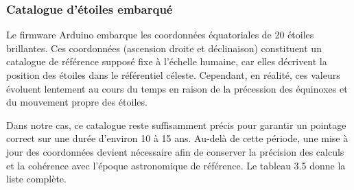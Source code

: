 \documentclass[12pt,a4paper]{report}
\begin{document}
\begin{enumerate}
\subsubsection{Catalogue d'étoiles embarqué}
Le firmware Arduino embarque les coordonnées équatoriales de 20 étoiles brillantes. Ces coordonnées (ascension droite et déclinaison) constituent un catalogue de référence supposé fixe à l’échelle humaine, car elles décrivent la position des étoiles dans le référentiel céleste. Cependant, en réalité, ces valeurs évoluent lentement au cours du temps en raison de la précession des équinoxes et du mouvement propre des étoiles.

Dans notre cas, ce catalogue reste suffisamment précis pour garantir un pointage correct sur une durée d’environ 10 à 15 ans. Au-delà de cette période, une mise à jour des coordonnées devient nécessaire afin de conserver la précision des calculs et la cohérence avec l’époque astronomique de référence. Le tableau 3.5 donne la liste complète.


\end{enumerate}
\end{document}
